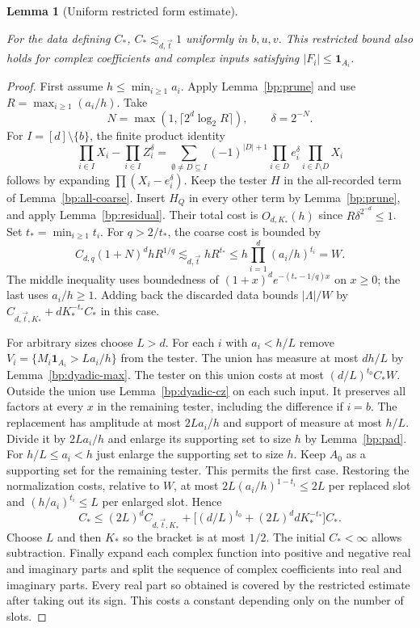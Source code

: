\documentclass[11pt,letterpaper]{article}
\newtheorem{lemma}[theorem]{Lemma}
\theoremstyle{definition}
\newcommand{\ind}{\mathbf1}
\providecommand{\lean}[1]{}
\providecommand{\uses}[1]{}
\begin{document}
\begin{lemma}[Uniform restricted form estimate]\label{bp:restricted}
\lean{TwistedParaproduct.restricted}
For the data defining \(C_*\), \(C_*\lesssim_{d,\vec t}1\) uniformly
in \(b,u,v\). This restricted bound also holds for complex coefficients
and complex inputs satisfying \(|F_i|\le\ind_{A_i}\).
\end{lemma}
\begin{proof}
\uses{bp:prune,bp:all-coarse,bp:residual,bp:dyadic-max,bp:dyadic-cz,bp:pad,bp:haar-square,bp:stopped-var}
First assume \(h\le\min_{i\ge1}a_i\). Apply Lemma~\ref{bp:prune} and
use \(R=\max_{i\ge1}(a_i/h)\). Take
\[
 N=\max(1,\lceil 2^d\log_2 R\rceil),\qquad \delta=2^{-N}.
\]
For \(I=[d]\setminus\{b\}\), the finite product identity
\[
 \prod_{i\in I}X_i-\prod_{i\in I}Z_i^\delta
   =\sum_{\emptyset\ne D\subseteq I}(-1)^{|D|+1}
           \prod_{i\in D} e_i^\delta \prod_{i\in I\setminus D}X_i
\]
follows by expanding \(\prod(X_i-e_i^\delta)\). Keep the tester \(H\)
in the all-recorded term of Lemma~\ref{bp:all-coarse}. Insert \(H_Q\)
in every other term by Lemma~\ref{bp:prune}, and apply
Lemma~\ref{bp:residual}. Their total cost is \(O_{d,K_*}(h)\) since
\(R\delta^{2^{-d}}\le1\).
Set \(t_*=\min_{i\ge1}t_i\). For \(q>2/t_*\), the coarse cost is bounded by
\[
 C_{d,q}(1+N)^d hR^{1/q}
     \lesssim_{d,\vec t} hR^{t_*}
     \le h\prod_{i=1}^d(a_i/h)^{t_i}=W .
\]
The middle inequality uses boundedness of
\((1+x)^d e^{-(t_*-1/q)x}\) on \(x\ge0\); the last uses \(a_i/h\ge1\).
Adding back the discarded data bounds \(|\Lambda|/W\) by
\(C_{d,\vec t,K_*}+dK_*^{-t_*}C_*\) in this case.

For arbitrary sizes choose \(L>d\). For each \(i\) with \(a_i<h/L\)
remove \(V_i=\{M_i\ind_{A_i}>L a_i/h\}\) from the tester.
The union has measure at most \(dh/L\) by Lemma~\ref{bp:dyadic-max}.
The tester on this union costs at most \((d/L)^{t_0}C_*W\).
Outside the union use Lemma~\ref{bp:dyadic-cz} on each such input.
It preserves all factors at every \(x\) in the remaining tester,
including the difference if \(i=b\). The replacement has amplitude at
most \(2L a_i/h\) and support of measure at most \(h/L\).
Divide it by \(2L a_i/h\) and enlarge its supporting set to size \(h\)
by Lemma~\ref{bp:pad}. For \(h/L\le a_i<h\) just enlarge the supporting
set to size \(h\). Keep \(A_0\) as a supporting set for the remaining
tester. This permits the first case. Restoring the normalization costs,
relative to \(W\), at most \(2L(a_i/h)^{1-t_i}\le2L\) per
replaced slot and \((h/a_i)^{t_i}\le L\) per enlarged slot. Hence
\[
 C_* \le (2L)^d C_{d,\vec t,K_*}
        +\big[(d/L)^{t_0}+(2L)^d d K_*^{-t_*}\big] C_* .
\]
Choose \(L\) and then \(K_*\) so the bracket is at most \(1/2\).
The initial \(C_*<\infty\) allows subtraction. Finally expand each
complex function into positive and negative real and imaginary parts
and split the sequence of complex coefficients into real and imaginary
parts. Every real part so obtained is covered by the restricted
estimate after taking out its sign. This costs a constant depending
only on the number of slots.
\end{proof}
\end{document}
